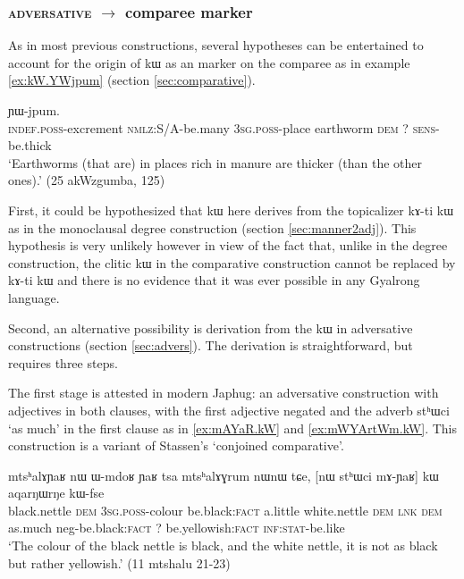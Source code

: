 \documentclass[oldfontcommands,oneside,a4paper,11pt]{article}
\newcommand{\ipa}[1]{{\phon #1}} %
\begin{document}
 
 
  \subsubsection{\textsc{adversative} $\rightarrow$ comparee marker}
  As in most previous constructions, several hypotheses can be entertained to account for the origin of \ipa{kɯ} as an marker on the comparee as in example \ref{ex:kW.YWjpum}  (section \ref{sec:comparative}).
  
        \begin{exe}
  \ex  \label{ex:kW.YWjpum}  
  \gll 
  [\ipa{tɯ-ɣli} 	\ipa{kɯ-dɤn} 	\ipa{ɯ-stu} \ipa{qandʐe} 	\ipa{nɯ}] 	\ipa{kɯ} 	\ipa{ɲɯ-jpum.} \\
  \textsc{indef.poss}-excrement \textsc{nmlz}:S/A-be.many \textsc{3sg.poss}-place earthworm \textsc{dem} ?{ } \textsc{sens}-be.thick   \\
  \glt `Earthworms (that are) in places rich in manure are thicker (than the other ones).'
   (25 akWzgumba, 125)
   \end{exe} 

  First, it could be hypothesized that \ipa{kɯ} here derives from the topicalizer \ipa{kɤ-ti kɯ}  as in the monoclausal degree construction (section \ref{sec:manner2adj}). This hypothesis is very unlikely however in view of the fact that, unlike in the degree construction, the clitic \ipa{kɯ} in the comparative construction cannot be replaced by \ipa{kɤ-ti kɯ} and there is no evidence that it was ever  possible in any Gyalrong language.
  
  
Second, an alternative possibility is derivation from the \ipa{kɯ} in adversative constructions (section \ref{sec:advers}). The derivation is straightforward, but requires three steps.

The first stage is attested in modern Japhug: an adversative construction with adjectives in both  clauses, with the first adjective negated and the adverb \ipa{stʰɯci} `as much' in the first clause as in \ref{ex:mAYaR.kW} and \ref{ex:mWYArtWm.kW}.  This construction is a variant of Stassen's \citeyearpar{stassen11comparative} `conjoined comparative'.

        \begin{exe}
  \ex  \label{ex:mAYaR.kW}  
  \gll 
  \ipa{mtsʰalɤɲaʁ} 	\ipa{nɯ} 	\ipa{ɯ-mdoʁ} 	\ipa{ɲaʁ} 	\ipa{tsa} 	\ipa{mtsʰalɤɣrum} 	\ipa{nɯnɯ} 	\ipa{tɕe,} 	[\ipa{nɯ} \ipa{stʰɯci} 	\ipa{mɤ-ɲaʁ}] 	\ipa{kɯ}   	\ipa{aqarŋɯrŋe} 	\ipa{kɯ-fse} 	\\
  black.nettle \textsc{dem} \textsc{3sg.poss}-colour be.black:\textsc{fact} a.little   white.nettle \textsc{dem} \textsc{lnk} \textsc{dem} as.much neg-be.black:\textsc{fact}  ?{ } be.yellowish:\textsc{fact} \textsc{inf:stat}-be.like \\
  \glt `The colour of the black nettle is black, and the white nettle, it is not as  black but rather yellowish.'   (11 mtshalu 21-23)
        \end{exe}
        
\end{document}
